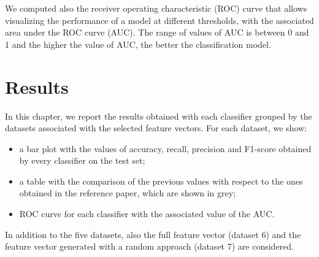 \documentclass{Configuration_Files/PoliMi3i_thesis}
\begin{document}
We computed also the receiver operating characteristic (ROC) curve that allows visualizing the performance of a model at different thresholds, with the associated area under the ROC curve (AUC).
The range of values of AUC is between 0 and 1 and the higher the value of AUC, the better the classification model.

\chapter{Results}
In this chapter, we report the results obtained with each classifier grouped by the datasets associated with the selected feature vectors. For each dataset, we show:
\begin{itemize}
    \item a bar plot with the values of accuracy, recall, precision and F1-score obtained by every classifier on the test set;
    \item a table with the comparison of the previous values with respect to the ones obtained in the reference paper, which are shown in grey;
    \item ROC curve for each classifier with the associated value of the AUC.
\end{itemize}
In addition to the five datasets, also the full feature vector (dataset 6) and the feature vector generated with a random approach (dataset 7) are considered.
\end{document}
